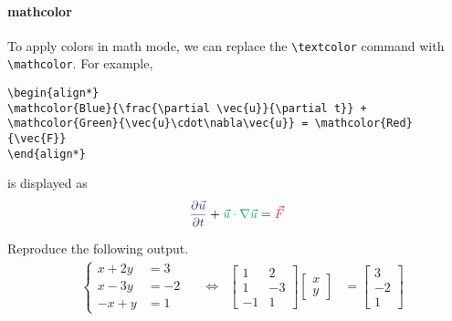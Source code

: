 \paragraph{mathcolor}
To apply colors in math mode, we can replace the \texttt{\textbackslash textcolor} command with \texttt{\textbackslash mathcolor}. For example,
\begin{lstlisting}
\begin{align*}
\mathcolor{Blue}{\frac{\partial \vec{u}}{\partial t}} + \mathcolor{Green}{\vec{u}\cdot\nabla\vec{u}} = \mathcolor{Red}{\vec{F}} 
\end{align*}
\end{lstlisting}
is displayed as
\begin{align*}
\mathcolor{Blue}{\frac{\partial \vec{u}}{\partial t}} + \mathcolor{Green}{\vec{u}\cdot\nabla\vec{u}} = \mathcolor{Red}{\vec{F}} 
\end{align*}

\begin{exercisebox}
\begin{Exercise}
Reproduce the following output.
\begin{align}
&\left\{\begin{aligned}
x + 2y &= 3 \\
x - 3y &= -2 \\
-x + y &= 1
\end{aligned}\right.
& & \Leftrightarrow
&\begin{bmatrix}
1 & 2 \\
1 & -3 \\
-1 & 1
\end{bmatrix}
\begin{bmatrix}
x \\
y
\end{bmatrix}
&=
\begin{bmatrix}
3 \\
-2 \\
1
\end{bmatrix}
\end{align}
\end{Exercise}
\end{exercisebox}